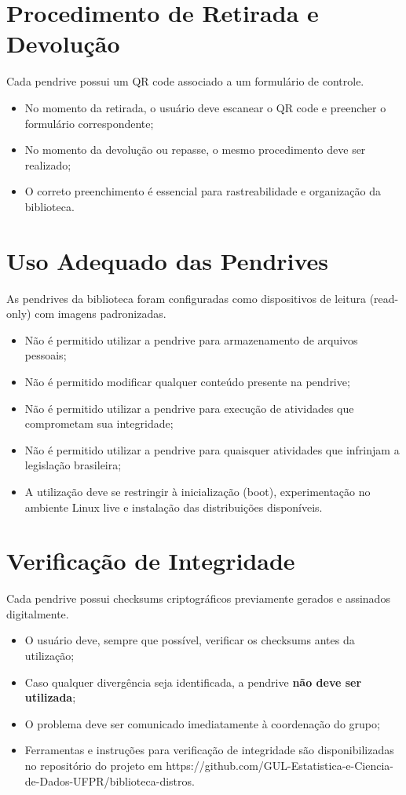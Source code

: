 \documentclass[12pt,a4paper]{article}
\begin{document}
\section{Procedimento de Retirada e Devolução}

Cada pendrive possui um QR code associado a um formulário de controle.

\begin{itemize}
    \item No momento da retirada, o usuário deve escanear o QR code e preencher o formulário correspondente;
    \item No momento da devolução ou repasse, o mesmo procedimento deve ser realizado;
    \item O correto preenchimento é essencial para rastreabilidade e organização da biblioteca.
\end{itemize}

\section{Uso Adequado das Pendrives}

As pendrives da biblioteca foram configuradas como dispositivos de leitura (read-only) com imagens padronizadas.

\begin{itemize}
    \item Não é permitido utilizar a pendrive para armazenamento de arquivos pessoais;
    \item Não é permitido modificar qualquer conteúdo presente na pendrive;
    \item Não é permitido utilizar a pendrive para execução de atividades que comprometam sua integridade;
    \item Não é permitido utilizar a pendrive para quaisquer atividades que infrinjam a legislação brasileira;
    \item A utilização deve se restringir à inicialização (boot), experimentação no ambiente Linux live e instalação das distribuições disponíveis.
\end{itemize}

\section{Verificação de Integridade}

Cada pendrive possui checksums criptográficos previamente gerados e assinados digitalmente.

\begin{itemize}
    \item O usuário deve, sempre que possível, verificar os checksums antes da utilização;
    \item Caso qualquer divergência seja identificada, a pendrive \textbf{não deve ser utilizada};
    \item O problema deve ser comunicado imediatamente à coordenação do grupo;
    \item Ferramentas e instruções para verificação de integridade são disponibilizadas no repositório do projeto em https://github.com/GUL-Estatistica-e-Ciencia-de-Dados-UFPR/biblioteca-distros.
\end{itemize}
\end{document}
